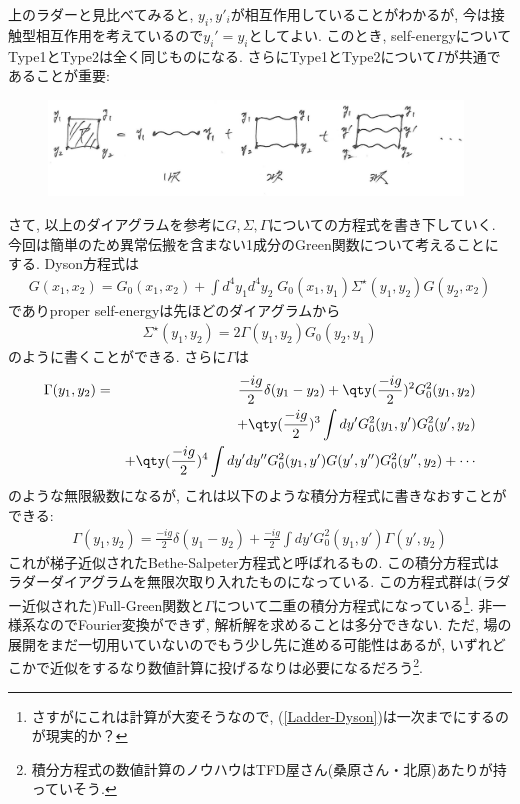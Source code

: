 \documentclass[10.5pt,a4paper]{jreport}
\begin{document}
上のラダーと見比べてみると, $y_i, y'_i$が相互作用していることがわかるが, 今は接触型相互作用を考えているので$y_i' = y_i$としてよい. このとき, self-energyについてType1とType2は全く同じものになる.  さらにType1とType2について$\Gamma$が共通であることが重要:
\begin{figure}[htbp]
  \begin{center}
    \includegraphics[width = 11cm]{./EPS/ladder3.eps}
  \end{center}
  \label{self-consistent}
\end{figure}
さて, 以上のダイアグラムを参考に$G, \Sigma, \Gamma$についての方程式を書き下していく. 今回は簡単のため異常伝搬を含まない1成分のGreen関数について考えることにする. Dyson方程式は
\begin{eqnarray}
  G(x_1, x_2) = G_0(x_1, x_2) + \int d^4y_1d^4y_2\;G_0(x_1, y_1)\Sigma^\star(y_1, y_2)G(y_2, x_2)\label{Ladder-Dyson}
\end{eqnarray}
でありproper self-energyは先ほどのダイアグラムから
\begin{eqnarray}
  \Sigma^\star(y_1, y_2) = 2\Gamma(y_1, y_2)G_0(y_2, y_1)
\end{eqnarray}
のように書くことができる. さらに$\Gamma$は
\begin{eqnarray}
\nonumber  \Gamma(y_1, y_2) &=& \frac{-ig}{2}\delta(y_1 - y_2) + \qty(\frac{-ig}{2})^2G_0^2(y_1, y_2)\\
\nonumber  &&+ \qty(\frac{-ig}{2})^3\int dy' G_0^2(y_1, y')G_0^2(y', y_2)\\
  &&+ \qty(\frac{-ig}{2})^4\int dy'dy'' G_0^2(y_1, y')G(y', y'')G_0^2(y'', y_2) + \cdots
\end{eqnarray}
のような無限級数になるが, これは以下のような積分方程式に書きなおすことができる:
\begin{eqnarray}
  \Gamma(y_1, y_2) = \frac{-ig}{2}\delta(y_1 - y_2) + \frac{-ig}{2}\int dy'G_0^2(y_1, y')\Gamma(y', y_2)\label{Bethe-Salpeter}
\end{eqnarray}
これが梯子近似されたBethe-Salpeter方程式と呼ばれるもの. この積分方程式はラダーダイアグラムを無限次取り入れたものになっている. この方程式群は(ラダー近似された)Full-Green関数と$\Gamma$について二重の積分方程式になっている\footnote{さすがにこれは計算が大変そうなので, (\ref{Ladder-Dyson})は一次までにするのが現実的か？}. 非一様系なのでFourier変換ができず, 解析解を求めることは多分できない. ただ, 場の展開をまだ一切用いていないのでもう少し先に進める可能性はあるが, いずれどこかで近似をするなり数値計算に投げるなりは必要になるだろう\footnote{積分方程式の数値計算のノウハウはTFD屋さん(桑原さん・北原)あたりが持っていそう. }. 
\end{document}
